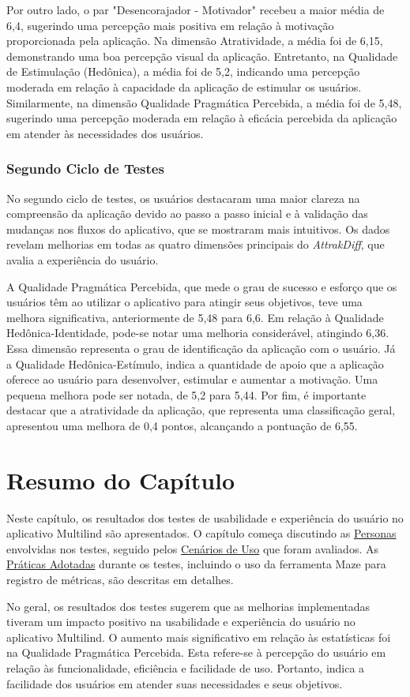 Por outro lado, o par "Desencorajador - Motivador" recebeu a maior média de 6,4, sugerindo uma percepção mais positiva em relação à motivação proporcionada pela aplicação. Na dimensão Atratividade, a média foi de 6,15, demonstrando uma boa percepção visual da aplicação. Entretanto, 
na Qualidade de Estimulação (Hedônica), a média foi de 5,2, indicando uma percepção moderada em relação à capacidade da aplicação de estimular os usuários. Similarmente, na dimensão Qualidade Pragmática Percebida, a média foi de 5,48, sugerindo uma percepção moderada em relação à 
eficácia percebida da aplicação em atender às necessidades dos usuários.

\subsubsection{Segundo Ciclo de Testes}
\label{sec:Segundo Ciclo de Testes2}
No segundo ciclo de testes, os usuários destacaram uma maior clareza na compreensão da aplicação devido ao passo a passo inicial e à validação das mudanças nos fluxos do aplicativo, que se mostraram mais intuitivos. Os dados revelam melhorias em todas as quatro dimensões principais do 
\textit{AttrakDiff}, que avalia a experiência do usuário. 

A Qualidade Pragmática Percebida, que mede o grau de sucesso e esforço que os usuários têm ao utilizar o aplicativo para atingir seus objetivos, teve uma melhora significativa, anteriormente de 5,48 para 6,6. Em relação à 
Qualidade Hedônica-Identidade, pode-se notar uma melhoria considerável, atingindo 6,36. Essa dimensão representa o grau de identificação da aplicação com o usuário. Já a Qualidade Hedônica-Estímulo, indica a quantidade de apoio que a aplicação oferece ao usuário 
para desenvolver, estimular e aumentar a motivação. Uma pequena melhora pode ser notada, de 5,2 para 5,44. Por fim, é importante destacar que a atratividade da aplicação, que representa uma classificação geral, apresentou uma melhora de 0,4 pontos, alcançando a 
pontuação de 6,55.

\section{Resumo do Capítulo}
\label{sec:Resumo do Capítulo 3}
Neste capítulo, os resultados dos testes de usabilidade e experiência do usuário no aplicativo Multilind são apresentados. O capítulo começa discutindo as \hyperref[sec:Personas]{Personas} envolvidas nos testes, seguido pelos \hyperref[sec:Cenários de Uso]{Cenários de Uso} que foram avaliados. 
As \hyperref[sec:Práticas Adotadas]{Práticas Adotadas} durante os testes, incluindo o uso da ferramenta Maze para registro de métricas, são descritas em detalhes.

No geral, os resultados dos testes sugerem que as melhorias implementadas tiveram um impacto positivo na usabilidade e experiência do usuário no aplicativo Multilind. O aumento mais significativo em relação às estatísticas foi na Qualidade Pragmática Percebida. Esta refere-se à percepção 
do usuário em relação às funcionalidade, eficiência e facilidade de uso. Portanto, indica a facilidade dos usuários em atender suas necessidades e seus objetivos.